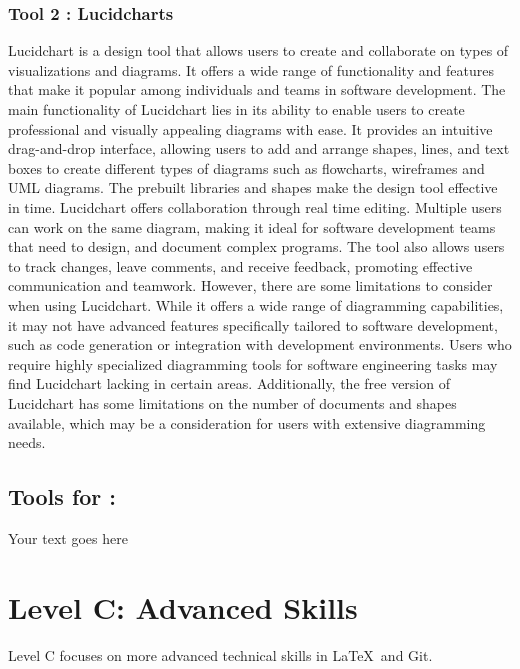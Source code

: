 \documentclass[a4paper, 11pt]{report}
\begin{document}
\subsubsection{Tool 2 : Lucidcharts}
Lucidchart is a design tool that allows users to create and collaborate on types of visualizations and diagrams. It offers a wide range of functionality and features that make it popular among individuals and teams in software development. The main functionality of Lucidchart lies in its ability to enable users to create professional and visually appealing diagrams with ease. It provides an intuitive drag-and-drop interface, allowing users to add and arrange shapes, lines, and text boxes to create different types of diagrams such as flowcharts, wireframes and UML diagrams. The prebuilt libraries and shapes make the design tool effective in time. Lucidchart offers collaboration through real time editing. Multiple users can work on the same diagram, making it ideal for software development teams that need to design, and document complex programs. The tool also allows users to track changes, leave comments, and receive feedback, promoting effective communication and teamwork. However, there are some limitations to consider when using Lucidchart. While it offers a wide range of diagramming capabilities, it may not have advanced features specifically tailored to software development, such as code generation or integration with development environments. Users who require highly specialized diagramming tools for software engineering tasks may find Lucidchart lacking in certain areas. Additionally, the free version of Lucidchart has some limitations on the number of documents and shapes available, which may be a consideration for users with extensive diagramming needs.

\subsection{Tools for \majD: \studD}

Your text goes here



\newpage
\section{Level C: Advanced Skills}

Level C focuses on more advanced technical skills in \LaTeX\ and Git.
\end{document}
